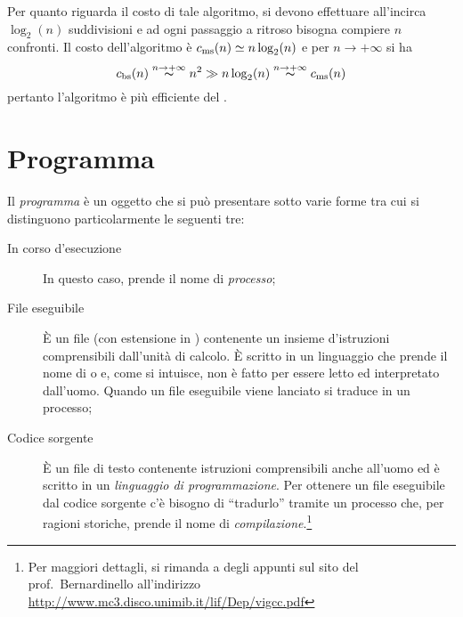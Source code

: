 Per quanto riguarda il costo di tale algoritmo, si devono effettuare all'incirca $\log_2(n)$ suddivisioni e ad ogni passaggio a ritroso bisogna compiere $n$ confronti.
Il costo dell'algoritmo è $c_\textup{ms}(n)\simeq n\log_{2}(n)$ e per $n\to+\infty$ si ha
\[
c_\textup{bs}(n)\overset{n\to+\infty}{\thicksim} n^{2} \gg n\log_{2}(n) \overset{n\to+\infty}{\thicksim} c_\textup{ms}(n)
\]
pertanto l'algoritmo  è più efficiente del .


	\section{Programma}

Il \emph{programma} è un oggetto che si può presentare sotto varie forme tra cui si distinguono particolarmente le seguenti tre:
\begin{description}
	\item[In corso d'esecuzione] In questo caso, prende il nome di \emph{processo};
	\item[File eseguibile] \`E un file (con estensione  in ) contenente un insieme d'istruzioni comprensibili dall'unità di calcolo.
\`E scritto in un linguaggio che prende il nome di  o  e, come si intuisce, non è fatto per essere letto ed interpretato dall'uomo.
Quando un file eseguibile viene lanciato si traduce in un processo;
	\item[Codice sorgente] \`E un file di testo contenente istruzioni comprensibili anche all'uomo ed è scritto in un \emph{linguaggio di programmazione}.
Per ottenere un file eseguibile dal codice sorgente c'è bisogno di ``tradurlo'' tramite un processo che, per ragioni storiche, prende il nome di \emph{compilazione}.\footnote{Per maggiori dettagli, si rimanda a degli appunti sul sito del prof.~Bernardinello all'indirizzo \url{http://www.mc3.disco.unimib.it/lif/Dep/vigcc.pdf}}
\end{description}